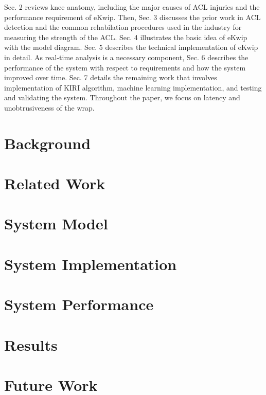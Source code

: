 \documentclass{sig-alternate}
\begin{document}
Sec. 2 reviews knee anatomy, including the major causes of ACL injuries and the performance requirement of eKwip. Then, Sec. 3 discusses the prior work in ACL detection and the common rehabilation procedures used in the industry for measuring the strength of the ACL. Sec. 4 illustrates the basic idea of eKwip with the model diagram. Sec. 5 describes the technical implementation of eKwip in detail. As real-time analysis is a necessary component, Sec. 6 describes the performance of the system with respect to requirements and how the system improved over time. Sec. 7 details the remaining work that involves implementation of KIRI algorithm, machine learning implementation, and testing and validating the system. Throughout the paper, we focus on latency and unobtrusiveness of the wrap.

\section{Background}
\label{sec:background}


\section{Related Work}
\label{sec:related_work}


\section{System Model}
\label{sec:system_model}


\section{System Implementation}
\label{sec:system_implementation}


\section{System Performance}
\label{sec:system_performance}


\section{Results}
\label{sec:results}


\section{Future Work}
\label{sec:future_work}


\end{document}
